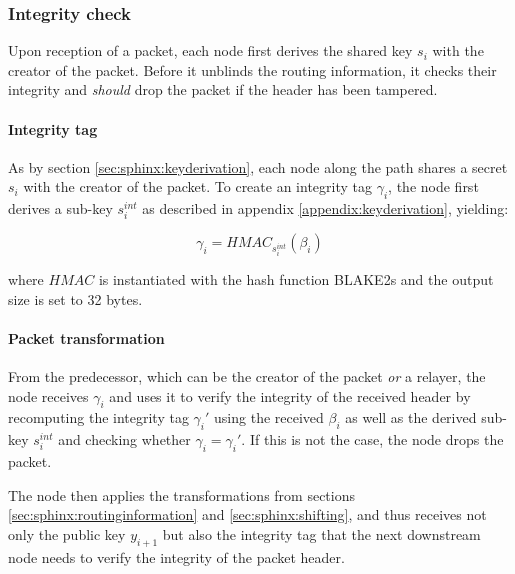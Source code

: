 \subsubsection{Integrity check}
\label{sec:sphinx:integrity}

Upon reception of a packet, each node first derives the shared key $s_i$ with the creator of the packet. Before it unblinds the routing information, it checks their integrity and \textit{should} drop the packet if the header has been tampered.

\paragraph{Integrity tag}

As by section \ref{sec:sphinx:keyderivation}, each node along the path shares a secret $s_i$ with the creator of the packet. To create an integrity tag $\gamma_i$, the node first derives a sub-key $s_i^{int}$ as described in appendix \ref{appendix:keyderivation}, yielding:

$$\gamma_i = HMAC_{s_i^{int}}(\beta_i)$$

where $HMAC$ is instantiated with the hash function \textsf{BLAKE2s} and the output size is set to 32 bytes.

\paragraph{Packet transformation}

From the predecessor, which can be the creator of the packet \textit{or} a relayer, the node receives $\gamma_i$ and uses it to verify the integrity of the received header by recomputing the integrity tag $\gamma_i'$ using the received $\beta_i$ as well as the derived sub-key $s_i^{int}$ and checking whether $\gamma_i = \gamma_i'$. If this is not the case, the node drops the packet.

The node then applies the transformations from sections \ref{sec:sphinx:routinginformation} and \ref{sec:sphinx:shifting}, and thus receives not only the public key $y_{i+1}$ but also the integrity tag that the next downstream node needs to verify the integrity of the packet header.

